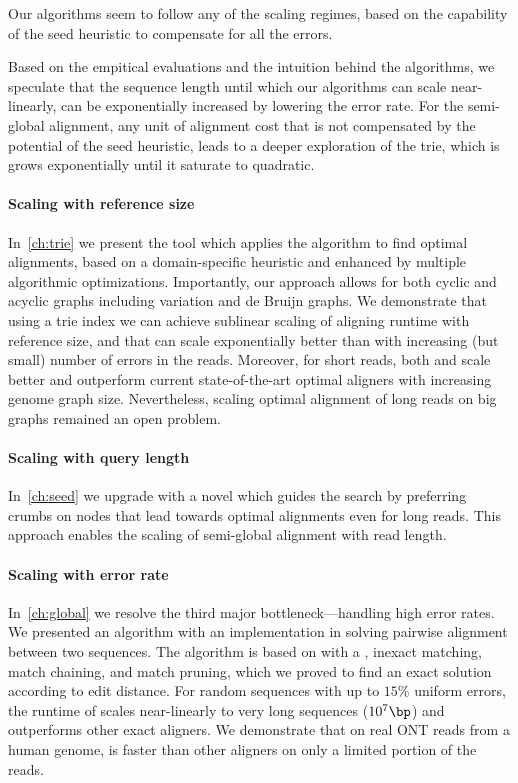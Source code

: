 Our algorithms seem to follow any of the scaling regimes, based on the
capability of the seed heuristic to compensate for all the errors.

Based on the empitical evaluations and the intuition behind the algorithms, we
speculate that the sequence length until which our algorithms can scale
near-linearly, can be exponentially increased by lowering the error rate. For
the semi-global alignment, any unit of alignment cost that is not compensated by
the potential of the seed heuristic, leads to a deeper exploration of the trie,
which is grows exponentially until it saturate to quadratic.

\paragraph{Scaling with reference size}
In~\cref{ch:trie} we present the tool \astarix which applies the \A algorithm to
find optimal alignments, based on a domain-specific heuristic and enhanced by
multiple algorithmic optimizations. Importantly, our approach allows for both
cyclic and acyclic graphs including variation and de Bruijn graphs. We
demonstrate that using a trie index we can achieve sublinear scaling of aligning
runtime with reference size, and that \A can scale exponentially better than
\dijkstra with increasing (but small) number of errors in the reads. Moreover,
for short reads, both \astarix and \dijkstra scale better and outperform current
state-of-the-art optimal aligners with increasing genome graph size.
Nevertheless, scaling optimal alignment of long reads on big graphs remained an
open problem.

\paragraph{Scaling with query length}
In~\cref{ch:seed} we upgrade \astarix with a novel \sh which guides the \A
search by preferring crumbs on nodes that lead towards optimal alignments even
for long reads. This approach enables the scaling of semi-global alignment with
read length.

\paragraph{Scaling with error rate}
In~\cref{ch:global} we resolve the third major bottleneck---handling high error
rates. We presented an algorithm with an implementation in \astarpa solving
pairwise alignment between two sequences. The algorithm is based on \A with a
\sh, inexact matching, match chaining, and match pruning, which we proved to
find an exact solution according to edit distance. For random sequences with up
to $15\%$ uniform errors, the runtime of \astarpa scales near-linearly to very
long sequences ($10^7\bp$) and outperforms other exact aligners. We demonstrate
that on real ONT reads from a human genome, \astarpa is faster than other
aligners on only a limited portion of the reads.

